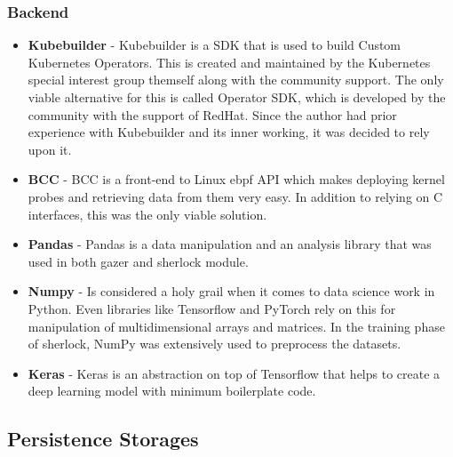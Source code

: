 \subsubsection{Backend}
\begin{itemize}[noitemsep,nolistsep] 
    \item \textbf{Kubebuilder} - Kubebuilder is a SDK that is used to build Custom Kubernetes Operators. This is created and maintained by the Kubernetes special interest group themself along with the community support. The only viable alternative for this is called Operator SDK, which is developed by the community with the support of RedHat. Since the author had prior experience with Kubebuilder and its inner working, it was decided to rely upon it.
    \item \textbf{BCC} - BCC is a front-end to Linux \ac{ebpf} API which makes deploying kernel probes and retrieving data from them very easy. In addition to relying on C interfaces, this was the only viable solution. 
    \item \textbf{Pandas} - Pandas is a data manipulation and an analysis library that was used in both \ac{gazer} and \ac{sherlock} module.
    \item \textbf{Numpy} - Is considered a holy grail when it comes to data science work in Python. Even libraries like Tensorflow and PyTorch rely on this for manipulation of multidimensional arrays and matrices. In the training phase of \ac{sherlock}, NumPy was extensively used to preprocess the datasets.
    \item \textbf{Keras} - Keras is an abstraction on top of Tensorflow that helps to create a deep learning model with minimum boilerplate code.
    
\end{itemize}

\subsection{Persistence Storages}

